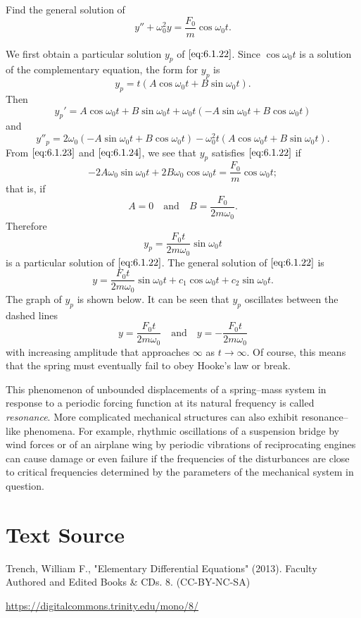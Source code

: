 \documentclass{ximera}
\begin{document}
 
 
\begin{example}\label{example:6.1.5}
Find the general solution of
\begin{equation}\label{eq:6.1.22}
y''+\omega_0^2y=\frac{F_0}{m}\cos\omega_0t.
\end{equation}
 
\begin{explanation}
We first obtain a particular solution $y_p$ of $\eqref{eq:6.1.22}$. Since
$\cos\omega_0t$ is a solution of the complementary equation, the form
for $y_p$ is
\begin{equation}\label{eq:6.1.23}
y_p=t(A\cos\omega_0t+B\sin\omega_0t).
\end{equation}
 Then
$$
y_p'=A\cos\omega_0t+B\sin\omega_0t
+\omega_0t(-A\sin\omega_0t+B\cos\omega_0t)
$$
and
\begin{equation}\label{eq:6.1.24}
y''_p=2\omega_0(-A\sin\omega_0t
+B\cos\omega_0t)-\omega_0^2t(A\cos\omega_0t+B\sin\omega_0t).
\end{equation}
From $\eqref{eq:6.1.23}$ and $\eqref{eq:6.1.24}$, we see that $y_p$ satisfies
$\eqref{eq:6.1.22}$ if
$$
-2A\omega_0\sin\omega_0t+2B\omega_0\cos\omega_0t=\frac{F_0}{m}
\cos\omega_0t;
$$
that is, if
$$
A=0\quad\mbox{and}\quad B=\frac{F_0}{2m\omega_0}.
$$
Therefore
$$
y_p=\frac{F_0t}{2m\omega_0}\sin\omega_0t
$$
is a particular solution of $\eqref{eq:6.1.22}$. The general solution of
$\eqref{eq:6.1.22}$ is
$$
y=\frac{F_0t}{2m\omega_0}\sin\omega_0t+c_1\cos\omega_0t+c_2\sin\omega_0t.
$$
The graph of $y_p$ is shown below.  It can be
seen that $y_p$ oscillates between the dashed lines
$$
y=\frac{F_0t}{2m\omega_0}\quad\mbox{and}\quad y=-\frac{F_0t}{2m\omega_0}
$$
with increasing amplitude that approaches $\infty$ as $t\rightarrow\infty$. Of
course, this means that the spring must eventually fail to obey Hooke's law
or break.

\begin{center}
\end{center}

\end{explanation}
\end{example}

This phenomenon of unbounded displacements of a spring--mass system in
response to a periodic forcing function at its natural
frequency is called \textit{resonance}. More complicated mechanical
structures can also exhibit resonance--like phenomena. For example,
rhythmic oscillations of a suspension bridge by wind forces or of an
airplane wing by periodic vibrations of reciprocating engines can
cause damage or even failure if the frequencies of the disturbances
are close to critical frequencies determined by the parameters of the
mechanical system in question.
 
\section*{Text Source}
Trench, William F., "Elementary Differential Equations" (2013). Faculty Authored and Edited Books \& CDs. 8. (CC-BY-NC-SA)
 
\href{https://digitalcommons.trinity.edu/mono/8/}{https://digitalcommons.trinity.edu/mono/8/}
 
\end{document}
